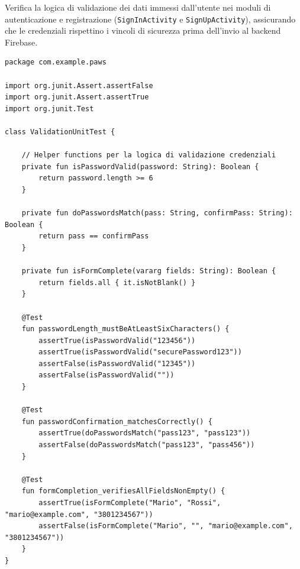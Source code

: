 \documentclass[a4paper]{report}
\begin{document}
Verifica la logica di validazione dei dati immessi dall'utente nei moduli di autenticazione e registrazione (\texttt{SignInActivity} e \texttt{SignUpActivity}), assicurando che le credenziali rispettino i vincoli di sicurezza prima dell'invio al backend Firebase.
\begin{scriptsize}
\estiloKotlin
\begin{lstlisting}[caption={Unit Test per la validazione di password, coincidenza credenziali e moduli}, label={lst:validation_test}]
package com.example.paws

import org.junit.Assert.assertFalse
import org.junit.Assert.assertTrue
import org.junit.Test

class ValidationUnitTest {

    // Helper functions per la logica di validazione credenziali
    private fun isPasswordValid(password: String): Boolean {
        return password.length >= 6
    }

    private fun doPasswordsMatch(pass: String, confirmPass: String): Boolean {
        return pass == confirmPass
    }

    private fun isFormComplete(vararg fields: String): Boolean {
        return fields.all { it.isNotBlank() }
    }

    @Test
    fun passwordLength_mustBeAtLeastSixCharacters() {
        assertTrue(isPasswordValid("123456"))
        assertTrue(isPasswordValid("securePassword123"))
        assertFalse(isPasswordValid("12345"))
        assertFalse(isPasswordValid(""))
    }

    @Test
    fun passwordConfirmation_matchesCorrectly() {
        assertTrue(doPasswordsMatch("pass123", "pass123"))
        assertFalse(doPasswordsMatch("pass123", "pass456"))
    }

    @Test
    fun formCompletion_verifiesAllFieldsNonEmpty() {
        assertTrue(isFormComplete("Mario", "Rossi", "mario@example.com", "3801234567"))
        assertFalse(isFormComplete("Mario", "", "mario@example.com", "3801234567"))
    }
}
\end{lstlisting}
\end{scriptsize}
\end{document}
